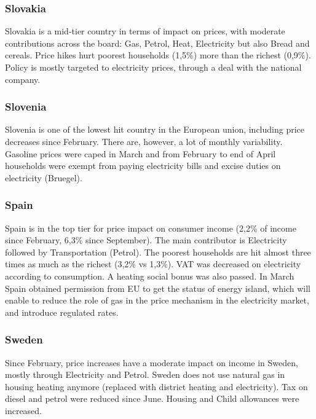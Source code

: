 \documentclass[
  9pt,
  a4paper,
  DIV=11,
  numbers=noendperiod,
  oneside]{scrartcl}
\begin{document}
\hypertarget{slovakia}{%
\subsubsection{Slovakia}\label{slovakia}}

Slovakia is a mid-tier country in terms of impact on prices, with
moderate contributions across the board: Gas, Petrol, Heat, Electricity
but also Bread and cereals. Price hikes hurt poorest households (1,5\%)
more than the richest (0,9\%). Policy is mostly targeted to electricity
prices, through a deal with the national company.

\hypertarget{slovenia}{%
\subsubsection{Slovenia}\label{slovenia}}

Slovenia is one of the lowest hit country in the European union,
including price decreases since February. There are, however, a lot of
monthly variability. Gasoline prices were caped in March and from
February to end of April households were exempt from paying electricity
bills and excise duties on electricity (Bruegel).

\hypertarget{spain}{%
\subsubsection{Spain}\label{spain}}

Spain is in the top tier for price impact on consumer income (2,2\% of
income since February, 6,3\% since September). The main contributor is
Electricity followed by Transportation (Petrol). The poorest households
are hit almost three times as much as the richest (3,2\% vs 1,3\%). VAT
was decreased on electricity according to consumption. A heating social
bonus was also passed. In March Spain obtained permission from EU to get
the status of energy island, which will enable to reduce the role of gas
in the price mechanism in the electricity market, and introduce
regulated rates.

\hypertarget{sweden}{%
\subsubsection{Sweden}\label{sweden}}

Since February, price increases have a moderate impact on income in
Sweden, mostly through Electricity and Petrol. Sweden does not use
natural gas in housing heating anymore (replaced with district heating
and electricity). Tax on diesel and petrol were reduced since June.
Housing and Child allowances were increased.
\end{document}
